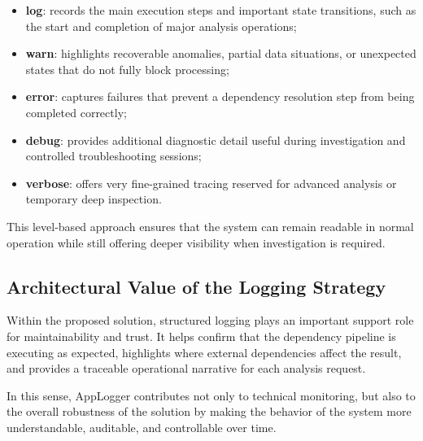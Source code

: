 \begin{itemize}
  \item \textbf{log}: records the main execution steps and important state transitions, such as the start and completion of major analysis operations;
  \item \textbf{warn}: highlights recoverable anomalies, partial data situations, or unexpected states that do not fully block processing;
  \item \textbf{error}: captures failures that prevent a dependency resolution step from being completed correctly;
  \item \textbf{debug}: provides additional diagnostic detail useful during investigation and controlled troubleshooting sessions;
  \item \textbf{verbose}: offers very fine-grained tracing reserved for advanced analysis or temporary deep inspection.
\end{itemize}

This level-based approach ensures that the system can remain readable in normal
operation while still offering deeper visibility when investigation is required.

\subsection{Architectural Value of the Logging Strategy}

Within the proposed solution, structured logging plays an important support role
for maintainability and trust. It helps confirm that the dependency pipeline is
executing as expected, highlights where external dependencies affect the result,
and provides a traceable operational narrative for each analysis request.

In this sense, AppLogger contributes not only to technical monitoring, but also
to the overall robustness of the solution by making the behavior of the system
more understandable, auditable, and controllable over time.